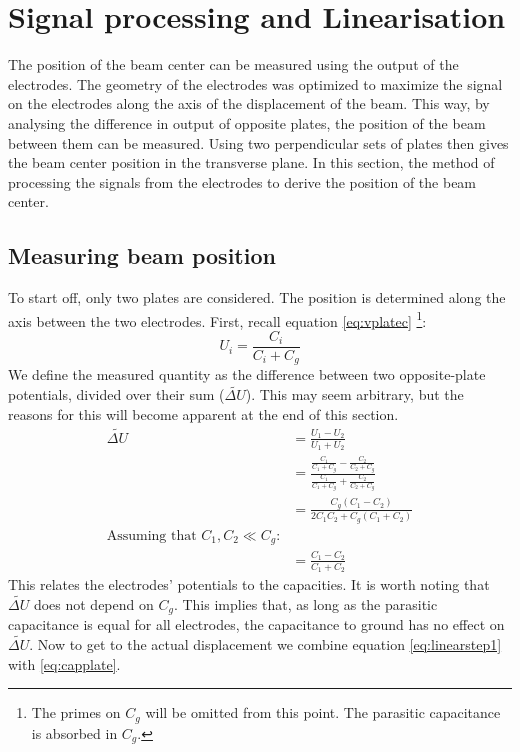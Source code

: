 \newpage
\section{Signal processing and Linearisation}
The position of the beam center can be measured using the output of the electrodes. The geometry of the electrodes was optimized to maximize the signal on the electrodes along the axis of the displacement of the beam. This way, by analysing the difference in output of opposite plates, the position of the beam between them can be measured. Using two perpendicular sets of plates then gives the beam center position in the transverse plane.
In this section, the method of processing the signals from the electrodes to derive the position of the beam center.
\subsection{Measuring beam position}
To start off, only two plates are considered. The position is determined along the axis between the two electrodes. First, recall equation \ref{eq:vplatec} \footnote{The primes on $C_g$ will be omitted from this point. The parasitic capacitance is absorbed in $C_g$.}:
\begin{equation*}
U_i=\frac{C_i}{C_i+C_g}
\end{equation*}
We define the measured quantity as the difference between two opposite-plate potentials, divided over their sum ($\widetilde{\Delta U}$). This may seem arbitrary, but the reasons for this will become apparent at the end of this section.
\begin{align}
\widetilde{\Delta U} &= \frac{U_1-U_2}{U_1+U_2} \nonumber \\
&= \frac{\frac{C_1}{C_1+C_g}-\frac{C_2}{C_2+C_g}}{\frac{C_1}{C_1+C_g}+\frac{C_2}{C_2+C_g}} \nonumber \\
&= \frac{C_g(C_1-C_2)}{2C_1C_2+C_g(C_1+C_2)} \nonumber \\
\text{Assuming that $C_1,C_2 \ll C_g$:} \nonumber \\
&= \frac{C_1-C_2}{C_1+C_2} \label{eq:linearstep1}
\end{align}
This relates the electrodes' potentials to the capacities. It is worth noting that $\widetilde{\Delta U}$ does not depend on $C_g$. This implies that, as long as the parasitic capacitance is equal for all electrodes, the capacitance to ground has no effect on $\widetilde{\Delta U}$. Now to get to the actual displacement we combine equation \ref{eq:linearstep1} with \ref{eq:capplate}. %
